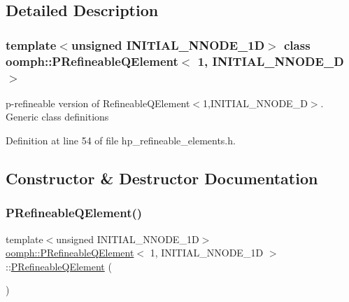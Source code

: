 \subsection{Detailed Description}
\subsubsection*{template$<$unsigned I\+N\+I\+T\+I\+A\+L\+\_\+\+N\+N\+O\+D\+E\+\_\+1D$>$\newline
class oomph\+::\+P\+Refineable\+Q\+Element$<$ 1, I\+N\+I\+T\+I\+A\+L\+\_\+\+N\+N\+O\+D\+E\+\_\+D $>$}

p-\/refineable version of Refineable\+Q\+Element$<$1,\+I\+N\+I\+T\+I\+A\+L\+\_\+\+N\+N\+O\+D\+E\+\_\+D$>$. Generic class definitions 

Definition at line 54 of file hp\+\_\+refineable\+\_\+elements.\+h.



\subsection{Constructor \& Destructor Documentation}
\mbox{\label{classoomph_1_1PRefineableQElement_3_011_00_01INITIAL__NNODE__1D_01_4_ae64763037f44f59a5950c43d9fcc0a5e}} 
\subsubsection{\texorpdfstring{P\+Refineable\+Q\+Element()}{PRefineableQElement()}}
{\footnotesize\ttfamily template$<$unsigned I\+N\+I\+T\+I\+A\+L\+\_\+\+N\+N\+O\+D\+E\+\_\+1D$>$ \\
\hyperlink{classoomph_1_1PRefineableQElement}{oomph\+::\+P\+Refineable\+Q\+Element}$<$ 1, I\+N\+I\+T\+I\+A\+L\+\_\+\+N\+N\+O\+D\+E\+\_\+1D $>$\+::\hyperlink{classoomph_1_1PRefineableQElement}{P\+Refineable\+Q\+Element} (\begin{DoxyParamCaption}{ }\end{DoxyParamCaption})\hspace{0.3cm}{\ttfamily [inline]}}



